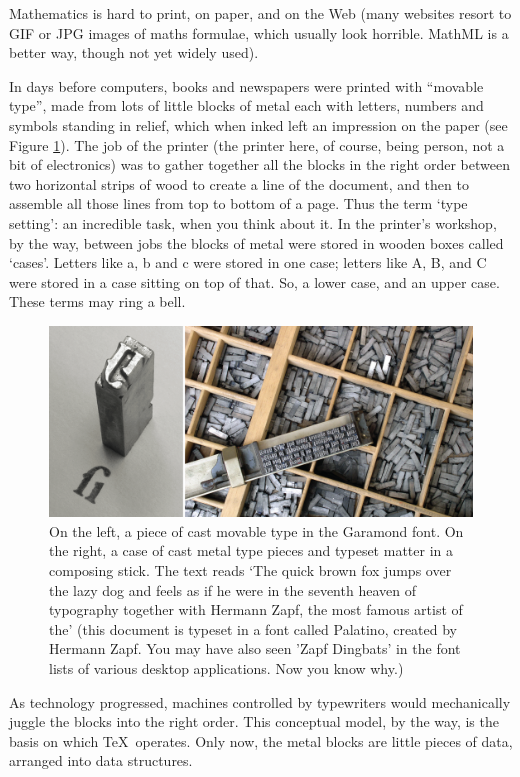 \begin{refsection}
Mathematics is hard to print, on paper, and on the Web (many websites resort to GIF or JPG images of maths formulae, which usually look horrible. MathML is a better way, though not yet widely used).

In days before computers, books and newspapers were printed with ``movable type'', made from lots of little blocks of metal each with letters, numbers and symbols standing in relief, which when inked left an impression on the paper (see Figure \ref{figure:movabletype}). The job of the printer (the printer here, of course, being person, not a bit of electronics) was to gather together all the blocks in the right order between two horizontal strips of wood to create a line of the document, and then to assemble all those lines from top to bottom of a page. Thus the term `type setting': an incredible task, when you think about it. In the printer's workshop, by the way, between jobs the blocks of metal were stored in wooden boxes called `cases'. Letters like a, b and c were stored in one case; letters like A, B, and C were stored in a case sitting on top of that. So, a lower case, and an upper case. These terms may ring a bell.

\begin{figure}
\centerline{\includegraphics[width=12cm]{images/movable-type.png}}
\caption{On the left, a piece of cast movable type in the Garamond font. On the right, a case of cast metal type pieces and typeset matter in a composing stick. The text reads `The quick brown fox jumps over the lazy dog and feels as if he were in the seventh heaven of typography together with Hermann Zapf, the most famous artist of the' (this document is typeset in a font called Palatino, created by Hermann Zapf. You may have also seen 'Zapf Dingbats' in the font lists of various desktop applications. Now you know why.)} \label{figure:movabletype}
\end{figure}

As technology progressed, machines controlled by typewriters would mechanically juggle the blocks into the right order. This conceptual model, by the way, is the basis on which \TeX\ operates. Only now, the metal blocks are little pieces of data, arranged into data structures. 


\end{refsection}
